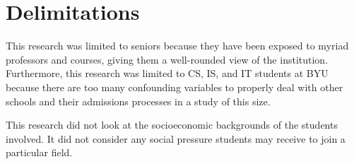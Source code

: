 \section{Delimitations}
This research was limited to seniors because they have been exposed to myriad professors and courses, giving them a well-rounded view of the institution. Furthermore, this research was limited to CS, IS, and IT students at BYU because there are too many confounding variables to properly deal with other schools and their admissions processes in a study of this size.

This research did not look at the socioeconomic backgrounds of the students involved. It did not consider any social pressure students may receive to join a particular field.

